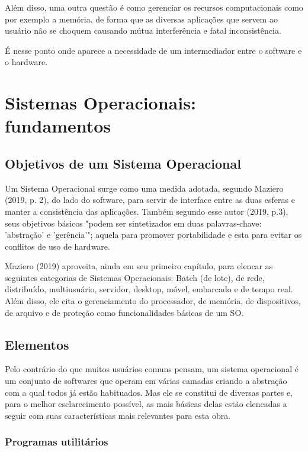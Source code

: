 \documentclass[conference]{IEEEtran}
\begin{document}
Além disso, uma outra questão é como gerenciar os recursos computacionais como por exemplo a memória, de forma que as diversas aplicações que servem ao usuário não se choquem causando mútua interferência e fatal inconsistência. 

É nesse ponto onde aparece a necessidade de um intermediador entre o software e o hardware.

\section{Sistemas Operacionais: fundamentos}

\subsection{Objetivos de um Sistema Operacional}

Um Sistema Operacional surge como uma medida adotada, segundo Maziero (2019, p. 2), do lado do software, para servir de interface entre as duas esferas e manter a consistência das aplicações. Também segundo esse autor (2019, p.3), seus objetivos básicos "podem ser sintetizados em duas palavras-chave: 'abstração' e 'gerência'"; aquela para promover portabilidade e esta para evitar os conflitos de uso de hardware.

Maziero (2019) aproveita, ainda em seu primeiro capítulo, para elencar as seguintes categorias de Sistemas Operacionais: Batch (de lote), de rede, distribuído, multiusuário, servidor, desktop, móvel, embarcado e de tempo real. Além disso, ele cita o gerenciamento do processador, de memória, de dispositivos, de arquivo e de proteção como funcionalidades básicas de um SO.

\subsection{Elementos}

Pelo contrário do que muitos usuários comuns pensam, um sistema operacional é um conjunto de softwares que operam em várias camadas criando a abstração com a qual todos já estão habituados. Mas ele se constitui de diversas partes e, para o melhor esclarecimento possível, as mais básicas delas estão elencadas a seguir com suas características mais relevantes para esta obra.

\subsubsection{Programas utilitários}
\end{document}
